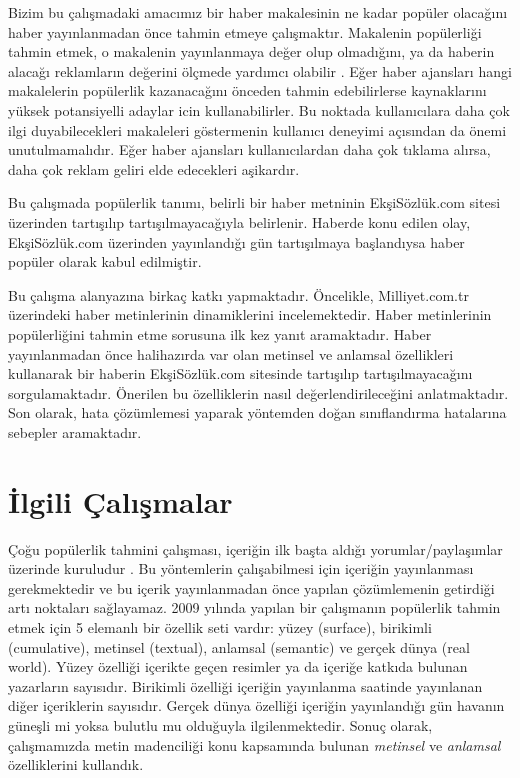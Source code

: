 \documentclass[conference]{IEEEtran}
\begin{document}
Bizim bu çalışmadaki amacımız bir haber makalesinin ne kadar popüler olacağını haber yayınlanmadan önce tahmin etmeye çalışmaktır. Makalenin popülerliği tahmin etmek, o makalenin yayınlanmaya değer olup olmadığını, ya da haberin alacağı reklamların değerini ölçmede yardımcı olabilir \cite{phukan_feasibility_2016}. Eğer haber ajansları hangi makalelerin popülerlik kazanacağını önceden tahmin edebilirlerse kaynaklarını yüksek potansiyelli adaylar icin kullanabilirler. Bu noktada kullanıcılara daha çok ilgi duyabilecekleri makaleleri göstermenin kullanıcı deneyimi açısından da önemi unutulmamalıdır. Eğer haber ajansları kullanıcılardan daha çok tıklama alırsa, daha çok reklam geliri elde edecekleri aşikardır. \cite{bandari_pulse_2012}

Bu çalışmada popülerlik tanımı, belirli bir haber metninin EkşiSözlük.com sitesi üzerinden tartışılıp tartışılmayacağıyla belirlenir. Haberde konu edilen olay, EkşiSözlük.com üzerinden yayınlandığı gün tartışılmaya başlandıysa haber popüler olarak kabul edilmiştir.

Bu çalışma alanyazına birkaç katkı yapmaktadır. Öncelikle, Milliyet.com.tr üzerindeki haber metinlerinin dinamiklerini incelemektedir. Haber metinlerinin popülerliğini tahmin etme sorusuna ilk kez yanıt aramaktadır. Haber yayınlanmadan önce halihazırda var olan metinsel ve anlamsal özellikleri kullanarak bir haberin EkşiSözlük.com sitesinde tartışılıp tartışılmayacağını sorgulamaktadır. Önerilen bu özelliklerin nasıl değerlendirileceğini anlatmaktadır. Son olarak, hata çözümlemesi yaparak yöntemden doğan sınıflandırma hatalarına sebepler aramaktadır.

 
\section{İlgili Çalışmalar}
Çoğu popülerlik tahmini çalışması, içeriğin ilk başta aldığı yorumlar/paylaşımlar üzerinde kuruludur \cite{szabo_predicting_2010}. Bu yöntemlerin çalışabilmesi için içeriğin yayınlanması gerekmektedir ve bu içerik yayınlanmadan önce yapılan çözümlemenin getirdiği artı noktaları sağlayamaz.
2009 yılında yapılan bir çalışmanın \cite{tsagkias_predicting_2009} popülerlik tahmin etmek için 5 elemanlı bir özellik seti vardır: yüzey (surface), birikimli (cumulative), metinsel (textual), anlamsal (semantic) ve gerçek dünya (real world). Yüzey özelliği içerikte geçen resimler ya da içeriğe katkıda bulunan yazarların sayısıdır. Birikimli özelliği içeriğin yayınlanma saatinde yayınlanan diğer içeriklerin sayısıdır. Gerçek dünya özelliği içeriğin yayınlandığı gün havanın güneşli mi yoksa bulutlu mu olduğuyla ilgilenmektedir. Sonuç olarak, çalışmamızda metin madenciliği konu kapsamında bulunan \emph{metinsel} ve \emph{anlamsal} özelliklerini kullandık.
\end{document}
